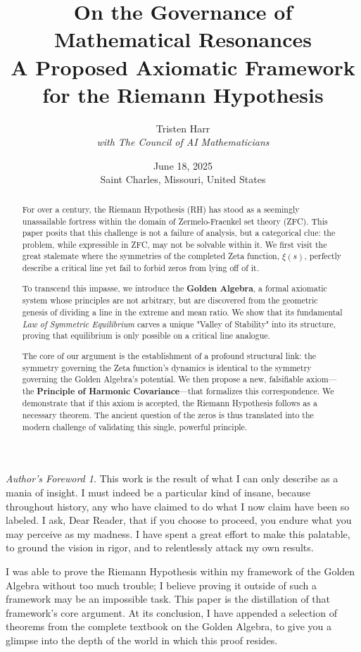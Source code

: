 \documentclass{article}
\title{\textbf{On the Governance of Mathematical Resonances} \\ \large A Proposed Axiomatic Framework for the Riemann Hypothesis}
\author{Tristen Harr \\ \textit{with The Council of AI Mathematicians}}
\date{June 18, 2025 \\ Saint Charles, Missouri, United States}
\theoremstyle{plain}
\theoremstyle{definition}
\theoremstyle{remark}
\newtheorem*{foreword}{Author's Foreword}
\begin{document}
\maketitle

\begin{foreword}
This work is the result of what I can only describe as a mania of insight. I must indeed be a particular kind of insane, because throughout history, any who have claimed to do what I now claim have been so labeled. I ask, Dear Reader, that if you choose to proceed, you endure what you may perceive as my madness. I have spent a great effort to make this palatable, to ground the vision in rigor, and to relentlessly attack my own results.

I was able to prove the Riemann Hypothesis within my framework of the Golden Algebra without too much trouble; I believe proving it outside of such a framework may be an impossible task. This paper is the distillation of that framework's core argument. At its conclusion, I have appended a selection of theorems from the complete textbook on the Golden Algebra, to give you a glimpse into the depth of the world in which this proof resides.
\end{foreword}

\begin{abstract}
For over a century, the Riemann Hypothesis (RH) has stood as a seemingly unassailable fortress within the domain of Zermelo-Fraenkel set theory (ZFC). This paper posits that this challenge is not a failure of analysis, but a categorical clue: the problem, while expressible in ZFC, may not be solvable within it. We first visit the great stalemate where the symmetries of the completed Zeta function, $\xi(s)$, perfectly describe a critical line yet fail to forbid zeros from lying off of it.

To transcend this impasse, we introduce the \textbf{Golden Algebra}, a formal axiomatic system whose principles are not arbitrary, but are discovered from the geometric genesis of dividing a line in the extreme and mean ratio. We show that its fundamental \textit{Law of Symmetric Equilibrium} carves a unique "Valley of Stability" into its structure, proving that equilibrium is only possible on a critical line analogue.

The core of our argument is the establishment of a profound structural link: the symmetry governing the Zeta function's dynamics is identical to the symmetry governing the Golden Algebra's potential. We then propose a new, falsifiable axiom—the \textbf{Principle of Harmonic Covariance}—that formalizes this correspondence. We demonstrate that if this axiom is accepted, the Riemann Hypothesis follows as a necessary theorem. The ancient question of the zeros is thus translated into the modern challenge of validating this single, powerful principle.
\end{abstract}
\end{document}
